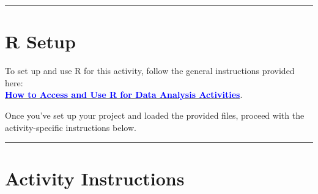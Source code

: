 \documentclass[oneside,openany]{book}
\begin{document}
\begin{center}\rule{0.5\linewidth}{0.5pt}\end{center}

\section{R Setup}\label{r-setup}

To set up and use R for this activity, follow the general instructions provided here:\\
\hyperref[how-to-set-up-r-for-data-analysis-activities]{\textcolor{blue}{\textbf{How to Access and Use R for Data Analysis Activities}}}.

Once you've set up your project and loaded the provided files, proceed with the activity-specific instructions below.

\begin{center}\rule{0.5\linewidth}{0.5pt}\end{center}

\section{Activity Instructions}\label{activity-instructions}
\end{document}
